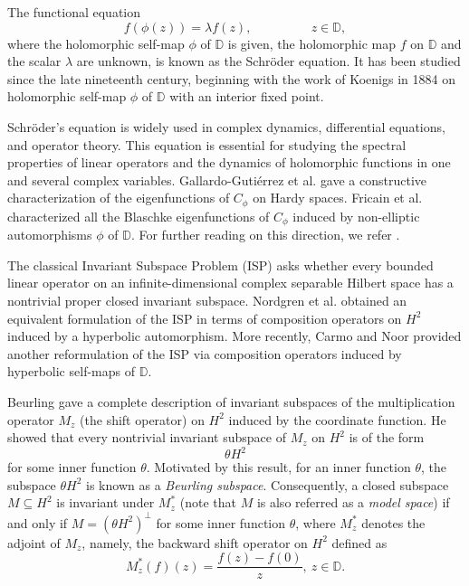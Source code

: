 \documentclass[12pt, reqno]{amsart}
\theoremstyle{definition}
\numberwithin{equation}{section}
\begin{document}
The functional equation
\begin{equation*}
	f(\phi(z))=\lambda f(z),~~~\qquad \qquad z \in \mathbb{D},
\end{equation*}
where the holomorphic self-map $\phi$ of $\mathbb{D}$ is given, the holomorphic map $f$ on $\mathbb{D}$ and the scalar $\lambda$ are unknown, is known as the Schröder equation. It has been studied since the late nineteenth century, beginning with the work of  Koenigs \cite{konigs} in 1884 on holomorphic self-map $\phi$ of $\mathbb{D}$ with an interior fixed point.

Schröder’s equation is widely used in complex dynamics, differential equations, and operator theory. This equation is essential for studying the spectral properties of linear operators and the dynamics of holomorphic functions in one and several complex variables.
Gallardo-Guti\'{e}rrez et al. \cite{orbits} gave a constructive characterization of the eigenfunctions of $C_\phi$ on Hardy spaces.
Fricain et al. \cite{modelsubspace} characterized all the Blaschke eigenfunctions of $ C_{\phi}$ induced by non-elliptic automorphisms $\phi$ of $\mathbb{D}$. For further reading on this direction, we refer \cite{cowenit,mobius}.

The classical Invariant Subspace Problem (ISP) asks whether every bounded linear operator on an infinite-dimensional complex separable Hilbert space has a nontrivial proper closed invariant subspace. Nordgren et al. \cite{COMP} obtained an equivalent formulation of the ISP in terms of composition operators on  $H^2$ induced by a hyperbolic automorphism. More recently, Carmo and Noor \cite{noor} provided another reformulation of the ISP via composition operators induced by hyperbolic self-maps of $\mathbb{D}$.

Beurling \cite{beurling} gave a complete description of invariant subspaces of the multiplication operator $M_z$ (the shift operator) on
$H^2$ induced by the coordinate function. He showed that every nontrivial invariant subspace of $M_z$ on $H^2$
is of the form 
$$\theta H^2$$ 
for some inner function 
$\theta$. Motivated by this result, for an inner function 
$\theta$, the subspace $\theta H^2$  is known as a \emph{Beurling subspace}.
Consequently, a closed subspace $M\subseteq H^2$ is invariant under $M_{z}^{*}$ (note that $M$ is also referred as a \emph{model space}) if and only if $M=(\theta H^2)^\perp$ for some inner function $\theta$, where $M_{z}^{*}$ denotes the adjoint of $M_z$, namely, the backward shift operator on $H^2$ defined as 
$$M_{z}^{*}(f)(z)=\dfrac{f(z)-f(0)}{z},~ z\in \mathbb{D}.$$
\end{document}
